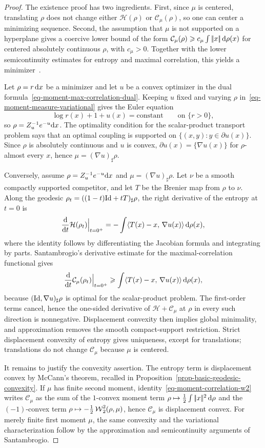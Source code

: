 \begin{proof}
	The existence proof has two ingredients. First, since $\mu$ is centered, translating $\rho$ does not change either $\mathcal H(\rho)$ or $\mathcal C_\mu(\rho)$, so one can center a minimizing sequence. Second, the assumption that $\mu$ is not supported on a hyperplane gives a coercive lower bound of the form $\mathcal C_\mu(\rho)\geqslant c_\mu\int|\!| x |\!|\,\mathrm{d}\rho(x)$ for centered absolutely continuous $\rho$, with $c_\mu>0$. Together with the lower semicontinuity estimates for entropy and maximal correlation, this yields a minimizer~\cite{Santambrogio2015MomentMeasures}.

	Let $\rho=r\,\mathrm{d} x$ be a minimizer and let $u$ be a convex optimizer in the dual formula~\eqref{eq-moment-max-correlation-dual}. Keeping $u$ fixed and varying $\rho$ in~\eqref{eq-moment-measure-variational} gives the Euler equation
	\[
		\log r(x)+1+u(x)=\mathrm{constant}
		\qquad\text{on }\{r>0\},
	\]
	so $\rho=Z_u^{-1}e^{-u}\mathrm{d} x$. The optimality condition for the scalar-product transport problem says that an optimal coupling is supported on $\{(x,y):y\in\partial u(x)\}$. Since $\rho$ is absolutely continuous and $u$ is convex, $\partial u(x)=\{\nabla u(x)\}$ for $\rho$-almost every $x$, hence $\mu=(\nabla u)_\sharp\rho$.

	Conversely, assume $\rho=Z_u^{-1}e^{-u}\mathrm{d} x$ and $\mu=(\nabla u)_\sharp\rho$. Let $\nu$ be a smooth compactly supported competitor, and let $T$ be the Brenier map from $\rho$ to $\nu$. Along the geodesic $\rho_t=((1-t)\mathrm{Id}+tT)_\sharp\rho$, the right derivative of the entropy at $t=0$ is
	\[
		\frac{\mathrm{d}}{\mathrm{d} t}\mathcal H(\rho_t)\Big|_{t=0^+}
		=
		-\int \langle T(x)-x,\,\nabla u(x)\rangle\,\mathrm{d}\rho(x),
	\]
	where the identity follows by differentiating the Jacobian formula and integrating by parts. Santambrogio's derivative estimate for the maximal-correlation functional gives
	\[
		\frac{\mathrm{d}}{\mathrm{d} t}\mathcal C_\mu(\rho_t)\Big|_{t=0^+}
		\geqslant
		\int \langle T(x)-x,\,\nabla u(x)\rangle\,\mathrm{d}\rho(x),
	\]
	because $(\mathrm{Id},\nabla u)_\sharp\rho$ is optimal for the scalar-product problem. The first-order terms cancel, hence the one-sided derivative of $\mathcal H+\mathcal C_\mu$ at $\rho$ in every such direction is nonnegative. Displacement convexity then implies global minimality, and approximation removes the smooth compact-support restriction. Strict displacement convexity of entropy gives uniqueness, except for translations; translations do not change $\mathcal C_\mu$ because $\mu$ is centered.

	It remains to justify the convexity assertion. The entropy term is displacement convex by McCann's theorem, recalled in Proposition~\ref{prop-basic-geodesic-convexity}. If $\mu$ has finite second moment, identity~\eqref{eq-moment-correlation-w2} writes $\mathcal C_\mu$ as the sum of the $1$-convex moment term $\rho\mapsto\frac12\int|\!| x |\!|^2\,\mathrm{d}\rho$ and the $(-1)$-convex term $\rho\mapsto-\frac12\operatorname{\mathcal{W}}_2^2(\rho,\mu)$, hence $\mathcal C_\mu$ is displacement convex. For merely finite first moment $\mu$, the same convexity and the variational characterization follow by the approximation and semicontinuity arguments of Santambrogio.
\end{proof}

